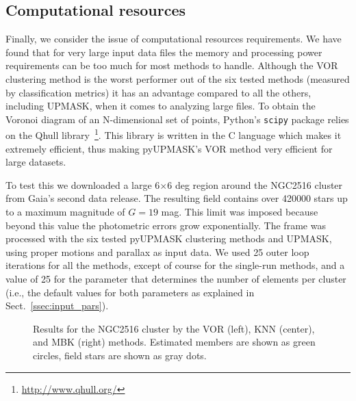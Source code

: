 \documentclass{aa}
\begin{document}
\subsection{Computational resources}
 \label{ssec:vor_ngc2516}

 Finally, we consider the issue of computational resources requirements.
 We have found that for very large input data files the memory and
 processing power requirements can be too much for most methods to handle.
 Although the VOR clustering method is the worst performer out of the six
 tested methods (measured by classification metrics) it has an advantage
 compared to all the others, including UPMASK, when it comes to analyzing large
 files. 
 To obtain the Voronoi diagram of an N-dimensional set of points, Python's 
 \texttt{scipy} package relies on the Qhull
 library~\citep{Barber_1996}\footnote{\url{http://www.qhull.org/}}.
 This library is written in the C language which makes it extremely efficient,
 thus making pyUPMASK's VOR method very efficient for large datasets.

 To test this we downloaded a large 6$\times$6 deg region around the NGC2516
 cluster from Gaia's second data release. The resulting field contains over
 420000 stars up to a maximum magnitude of $G=19$ mag. This limit was imposed
 because beyond this value the photometric errors grow exponentially.
 The frame was processed with the six tested pyUPMASK clustering methods
 and UPMASK, using proper motions and parallax as input data. We used 25
 outer loop iterations for all the methods, except of course for
 the single-run methods, and a value of 25 for the parameter that determines
 the number of elements per cluster (i.e., the default values for both
 parameters as explained in Sect.~\ref{ssec:input_pars}).\\

 \begin{figure}
 \caption{Results for the NGC2516 cluster by the VOR (left), KNN (center), and
 MBK (right) methods. Estimated members are shown as green circles, field stars
 are shown as gray dots.}
 \label{fig:NGC2516}
 \end{figure}
\end{document}
